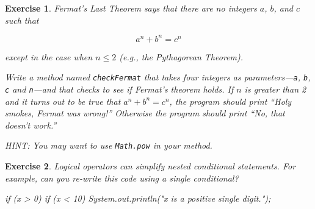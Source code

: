 \documentclass[12pt]{book}
\theoremstyle{exercise}
\newtheorem{exercise}{Exercise}[chapter]
\newcommand{\java}[1]{\lstinline{#1}} %
\begin{document}
\begin{exercise}
Fermat's Last Theorem says that there are no integers $a$, $b$, and $c$ such that

\[ a^n + b^n = c^n \]

except in the case when $n \leq 2$ (e.g., the Pythagorean Theorem).

Write a method named {\tt checkFermat} that takes four integers as parameters---{\tt a}, {\tt b}, {\tt c} and {\tt n}---and that checks to see if Fermat's theorem holds.
If $n$ is greater than 2 and it turns out to be true that $a^n + b^n = c^n$, the program should print ``Holy smokes, Fermat was wrong!''
Otherwise the program should print ``No, that doesn't work.''

HINT: You may want to use \java{Math.pow} in your method.
\end{exercise}


\begin{exercise}

Logical operators can simplify nested conditional statements.
For example, can you re-write this code using a single conditional?

\begin{code}
    if (x > 0) {
        if (x < 10) {
            System.out.println("x is a positive single digit.");
        }
    }
\end{code}

\end{exercise}
\end{document}
